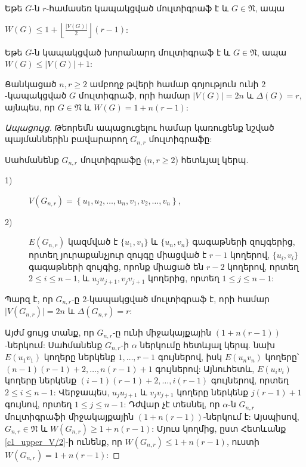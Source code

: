 \begin{hide}
\begin{corollary}
\label{c1_upper_V/2_regular} Եթե $G$-ն $r$-համասեռ կապակցված մուլտիգրաֆ է և $G\in \mathfrak{N}$, ապա
\begin{center}
$W(G)\leq 1+\left\lfloor \frac{\vert
V(G)\vert}{2}\right\rfloor(r-1)$:
\end{center}
\end{corollary}

\begin{corollary}
\label{c1_upper_Delta3} Եթե $G$-ն կապակցված խորանարդ մուլտիգրաֆ է և $G\in \mathfrak{N}$, ապա 
$W(G)\leq \vert V(G)\vert+1$:
\end{corollary}
\begin{theorem}
\label{t1_upper_bounds_are_sharp} Ցանկացած $n,r\geq 2$ ամբողջ թվերի համար գոյություն ունի $2$-կապակցված $G$ մուլտիգրաֆ, որի համար $\vert V(G)\vert =2n$ և
$\Delta(G)=r$, այնպես, որ $G\in \mathfrak{N}$ և $W(G)=1+n(r-1)$:
\end{theorem}
\begin{proof}[Ապացույց] Թեորեմն ապացուցելու համար կառուցենք նշված պայմաններին բավարարող 
$G_{n,r}$ մուլտիգրաֆը:

Սահմանենք $G_{n,r}$ մուլտիգրաֆը ($n,r\geq 2$) հետևյալ կերպ.

\begin{description}
\item[1)] $V\left(G_{n,r}\right)=\left\{u_{1},u_{2},\ldots,u_{n},v_{1},v_{2},\ldots,v_{n}\right\}$,
\item[2)] $E\left(G_{n,r}\right)$ կազմված է $\{u_{1},v_{1}\}$ և $\{u_{n},v_{n}\}$ գագաթների զույգերից, որտեղ յուրաքանչյուր զույգը միացված է $r-1$ կողերով, 
$\{u_{i},v_{i}\}$ գագաթների զույգից, որոնք միացած են $r-2$ կողերով, որտեղ $2\leq i\leq n-1$, և $u_{j}u_{j+1},v_{j}v_{j+1}$ կողերից, որտեղ $1\leq j\leq n-1$:
\end{description}

Պարզ է, որ $G_{n,r}$-ը $2$-կապակցված մուլտիգրաֆ է, որի համար $\vert
V\left(G_{n,r}\right)\vert =2n$ և $\Delta\left(G_{n,r}\right)=r$:

Այժմ ցույց տանք, որ $G_{n,r}$-ը ունի միջակայքային $(1+n(r-1))$-ներկում:
Սահմանենք $G_{n,r}$-ի $\alpha$ ներկումը հետևյալ կերպ. նախ $E(u_{1}v_{1})$ կողերը ներկենք $1,\ldots,r-1$ գույներով, իսկ $E(u_{n}v_{n})$ կողերը՝
$(n-1)(r-1)+2,\ldots,n(r-1)+1$ գույներով: Այնուհետև,
$E(u_{i}v_{i})$ կողերը ներկենք $(i-1)(r-1)+2,\ldots,i(r-1)$ գույներով, որտեղ
$2\leq i\leq n-1$: Վերջապես, $u_{j}u_{j+1}$ և
$v_{j}v_{j+1}$ կողերը ներկենք $j(r-1)+1$ գույնով, որտեղ $1\leq j\leq n-1$: Դժվար չէ տեսնել, որ $\alpha$-ն $G_{n,r}$ մուլտիգրաֆի միջակայքային $(1+n(r-1))$-ներկում է: Այսպիսով, $G_{n,r}\in \mathfrak{N}$ և $W\left(G_{n,r}\right)\geq 1+n(r-1)$:
Մյուս կողմից, ըստ Հետևանք \ref{c1_upper_V/2}-ի ունենք, որ $W\left(G_{n,r}\right)\leq 1+n(r-1)$, ուստի $W\left(G_{n,r}\right)= 1+n(r-1)$:
\end{proof}
\end{hide}
